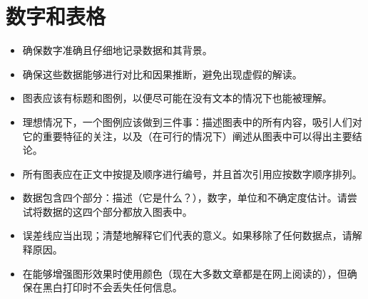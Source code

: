 \section*{数字和表格
}
\begin{itemize}
\item 确保数字准确且仔细地记录数据和其背景。
\item 确保这些数据能够进行对比和因果推断，避免出现虚假的解读。
\item 图表应该有标题和图例，以便尽可能在没有文本的情况下也能被理解。
\item 理想情况下，一个图例应该做到三件事：描述图表中的所有内容，吸引人们对它的重要特征的关注，以及（在可行的情况下）阐述从图表中可以得出主要结论。
\item 所有图表应在正文中按提及顺序进行编号，并且首次引用应按数字顺序排列。
\item 数据包含四个部分：描述（它是什么？），数字，单位和不确定度估计。请尝试将数据的这四个部分都放入图表中。
\item 误差线应当出现；清楚地解释它们代表的意义。如果移除了任何数据点，请解释原因。
\item 在能够增强图形效果时使用颜色（现在大多数文章都是在网上阅读的），但确保在黑白打印时不会丢失任何信息。

\end{itemize}
